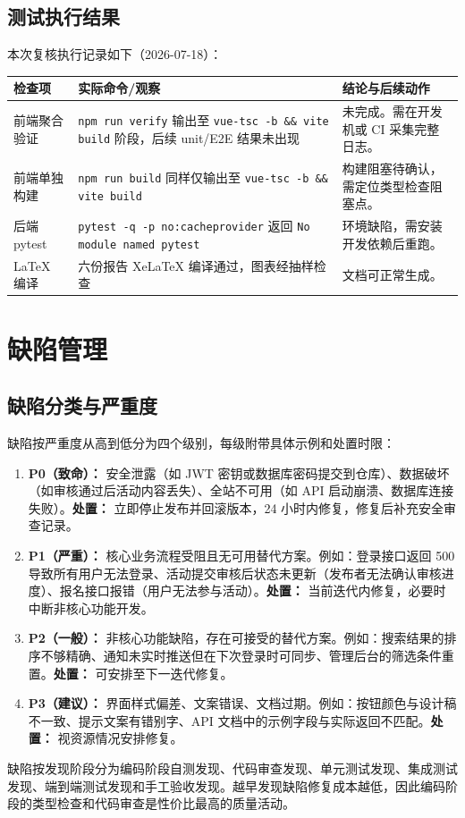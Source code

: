 \documentclass[12pt,a4paper]{ctexart}
\begin{document}
\subsection{测试执行结果}
本次复核执行记录如下（2026-07-18）：

\noindent\begin{tabularx}{\textwidth}{p{2.5cm}Y p{4cm}}
\toprule 检查项 & 实际命令/观察 & 结论与后续动作 \\\midrule
前端聚合验证 & \texttt{npm run verify} 输出至 \texttt{vue-tsc -b \&\& vite build} 阶段，后续 unit/E2E 结果未出现 & 未完成。需在开发机或 CI 采集完整日志。 \\
前端单独构建 & \texttt{npm run build} 同样仅输出至 \texttt{vue-tsc -b \&\& vite build} & 构建阻塞待确认，需定位类型检查阻塞点。 \\
后端 pytest & \texttt{pytest -q -p no:cacheprovider} 返回 \texttt{No module named pytest} & 环境缺陷，需安装开发依赖后重跑。 \\
LaTeX 编译 & 六份报告 XeLaTeX 编译通过，图表经抽样检查 & 文档可正常生成。 \\
\bottomrule
\end{tabularx}

\section{缺陷管理}
\subsection{缺陷分类与严重度}
缺陷按严重度从高到低分为四个级别，每级附带具体示例和处置时限：
\begin{enumerate}
\item \textbf{P0（致命）：} 安全泄露（如 JWT 密钥或数据库密码提交到仓库）、数据破坏（如审核通过后活动内容丢失）、全站不可用（如 API 启动崩溃、数据库连接失败）。\textbf{处置：} 立即停止发布并回滚版本，24 小时内修复，修复后补充安全审查记录。
\item \textbf{P1（严重）：} 核心业务流程受阻且无可用替代方案。例如：登录接口返回 500 导致所有用户无法登录、活动提交审核后状态未更新（发布者无法确认审核进度）、报名接口报错（用户无法参与活动）。\textbf{处置：} 当前迭代内修复，必要时中断非核心功能开发。
\item \textbf{P2（一般）：} 非核心功能缺陷，存在可接受的替代方案。例如：搜索结果的排序不够精确、通知未实时推送但在下次登录时可同步、管理后台的筛选条件重置。\textbf{处置：} 可安排至下一迭代修复。
\item \textbf{P3（建议）：} 界面样式偏差、文案错误、文档过期。例如：按钮颜色与设计稿不一致、提示文案有错别字、API 文档中的示例字段与实际返回不匹配。\textbf{处置：} 视资源情况安排修复。
\end{enumerate}
缺陷按发现阶段分为编码阶段自测发现、代码审查发现、单元测试发现、集成测试发现、端到端测试发现和手工验收发现。越早发现缺陷修复成本越低，因此编码阶段的类型检查和代码审查是性价比最高的质量活动。
\end{document}
